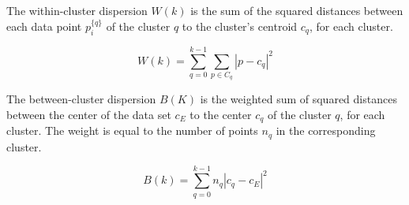 The within-cluster dispersion $W(k)$ is the sum of the squared distances between each data point $p_{i}^{\{q\}}$ of the cluster $q$ to the cluster's centroid $c_{q}$, for each cluster.

$$ W(k) = \sum_{q=0}^{k-1} \sum_{p \in C_{q}} |p - c_{q}|^{2} $$


The between-cluster dispersion $B(K)$ is the weighted sum of squared distances between the center of the data set $c_{E}$ to the center $c_{q}$ of the cluster $q$, for each cluster. The weight is equal to the number of points $n_{q}$ in the corresponding cluster.


$$ B(k) = \sum_{q = 0}^{k - 1} n_{q} |c_{q} - c_{E}|^{2} $$





